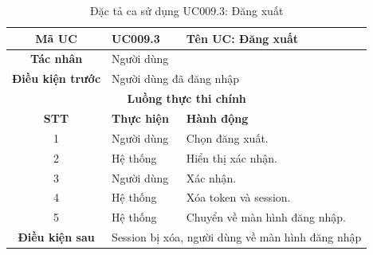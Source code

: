 \begin{table}[H]
    \centering
    \label{tab:uc009-3}
    \begin{tabularx}{\textwidth}{|c|p{3.5cm}|X|}
        \hline
        \rowcolor{headergreen} 
        \textbf{Mã UC} & \textbf{UC009.3} & \textbf{Tên UC: Đăng xuất} \\ \hline
        \textbf{Tác nhân} & \multicolumn{2}{l|}{Người dùng} \\ \hline
        \textbf{Điều kiện trước} & \multicolumn{2}{X|}{Người dùng đã đăng nhập} \\ \hline
        
        \multicolumn{3}{|c|}{\cellcolor{headerorange}\textbf{Luồng thực thi chính}} \\ \hline
        \rowcolor{graybg} \textbf{STT} & \textbf{Thực hiện} & \textbf{Hành động} \\ \hline
        1 & Người dùng & Chọn đăng xuất. \\ \hline
        2 & Hệ thống & Hiển thị xác nhận. \\ \hline
        3 & Người dùng & Xác nhận. \\ \hline
        4 & Hệ thống & Xóa token và session. \\ \hline
        5 & Hệ thống & Chuyển về màn hình đăng nhập. \\ \hline
        
        \textbf{Điều kiện sau} & \multicolumn{2}{X|}{Session bị xóa, người dùng về màn hình đăng nhập} \\ \hline
    \end{tabularx}
    \caption{Đặc tả ca sử dụng UC009.3: Đăng xuất}
\end{table}

